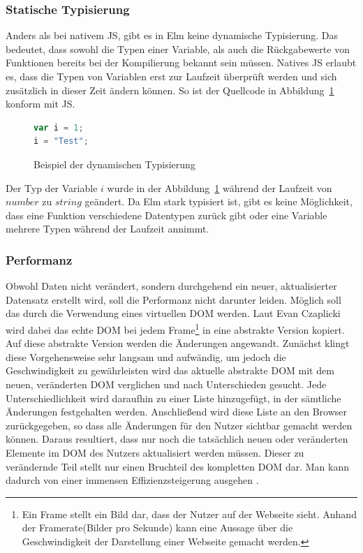 \subsubsection{Statische Typisierung}
\label{sec:Statische Typisierung}
Anders als bei nativem \ac{JS}, gibt es in Elm keine dynamische Typisierung. Das bedeutet, dass sowohl die Typen einer Variable, als auch die Rückgabewerte von Funktionen bereits bei der Kompilierung bekannt sein müssen. Natives \ac{JS} erlaubt es, dass die Typen von Variablen erst zur Laufzeit überprüft werden und sich zusätzlich in dieser Zeit ändern können. So ist der Quellcode in Abbildung~\ref{fig:dynamische-typisierung} konform mit \ac{JS}.
\begin{figure}[ht]
\begin{lstlisting}[language=JavaScript]
var i = 1;
i = "Test";
\end{lstlisting}
\caption{Beispiel der dynamischen Typisierung}\label{fig:dynamische-typisierung}
\end{figure}
Der Typ der Variable $i$ wurde in der Abbildung~\ref{fig:dynamische-typisierung} während der Laufzeit von $number$ zu $string$ geändert. Da Elm stark typisiert ist, gibt es keine Möglichkeit, dass eine Funktion verschiedene Datentypen zurück gibt oder eine Variable mehrere Typen während der Laufzeit annimmt.


\subsubsection{Performanz}
\label{sec:Performanz}
Obwohl Daten nicht verändert, sondern durchgehend ein neuer, aktualisierter Datensatz erstellt wird, soll die Performanz nicht darunter leiden. Möglich soll das durch die Verwendung eines virtuellen \ac{DOM} werden.
Laut Evan Czaplicki wird dabei das echte \ac{DOM} bei jedem \glqq Frame\grqq\footnote{Ein Frame stellt ein Bild dar, dass der Nutzer auf der Webseite sieht. Anhand der \glqq Framerate\grqq  (Bilder pro Sekunde) kann eine Aussage über die Geschwindigkeit der Darstellung einer Webseite gemacht werden.} in eine abstrakte Version kopiert. Auf diese abstrakte Version werden die Änderungen angewandt. Zunächst klingt diese Vorgehensweise sehr langsam und aufwändig, um jedoch die Geschwindigkeit zu gewährleisten wird das aktuelle abstrakte \ac{DOM} mit dem neuen, veränderten \ac{DOM} verglichen und nach Unterschieden gesucht. Jede Unterschiedlichkeit wird daraufhin zu einer Liste hinzugefügt, in der sämtliche Änderungen festgehalten werden. Anschließend wird diese Liste an den Browser zurückgegeben, so dass alle Änderungen für den Nutzer sichtbar gemacht werden können. Daraus resultiert, dass nur noch die tatsächlich neuen oder veränderten Elemente im \ac{DOM} des Nutzers aktualisiert werden müssen. Dieser zu verändernde Teil stellt nur einen Bruchteil des kompletten \ac{DOM} dar. Man kann dadurch von einer immensen Effizienzsteigerung ausgehen \cite[Vgl.]{web-programming-restarted}.

